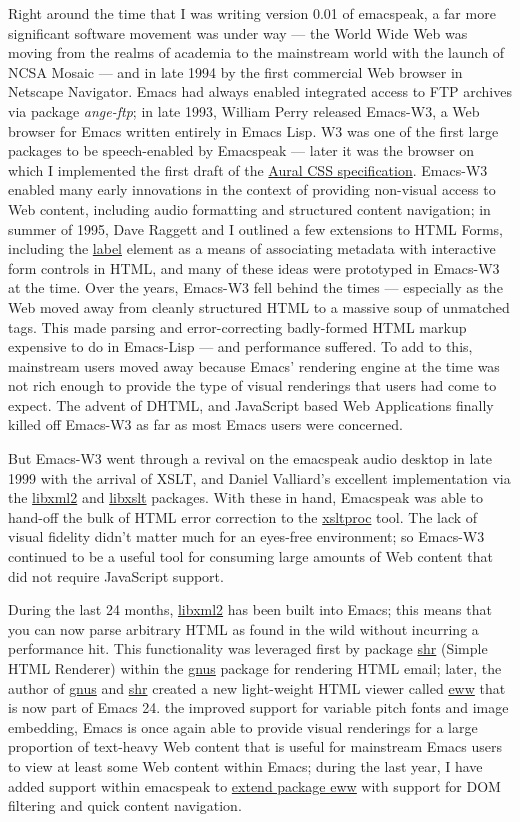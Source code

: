 \documentclass[11pt]{article}
\begin{document}
Right around the time that I was writing version 0.01 of
emacspeak, a far more significant software movement was under way
  —   the World Wide Web was moving from the realms of academia to
the mainstream world with the launch of NCSA Mosaic   — 
  and in
late 1994 by the first commercial Web browser in Netscape
Navigator. Emacs had always enabled integrated access to FTP
archives via package \emph{ange-ftp}; in late 1993, William Perry
released Emacs-W3, a Web browser for Emacs written entirely in
Emacs Lisp. W3 was one of the first large packages to be
speech-enabled by Emacspeak   —   later it was the browser on which
I implemented the first draft of the \href{http://www.w3.org/TR/CSS2/aural.html}{Aural CSS
specification}. Emacs-W3 enabled many early innovations in the
context of providing non-visual access to Web content, including
audio formatting and structured content navigation; in summer of
1995, Dave Raggett and I outlined a few extensions to HTML Forms,
including the \uline{label} element as a means of associating metadata
with interactive form controls in HTML, and many of these ideas
were prototyped in Emacs-W3 at the time. Over the years, Emacs-W3 fell
behind the times   —   especially as the Web moved away from
cleanly structured HTML to a massive soup of unmatched tags. This
made parsing and error-correcting badly-formed HTML markup
expensive to do in Emacs-Lisp  —  
and performance suffered. To add
to this, mainstream users moved away because Emacs' rendering
engine at the time was not rich enough to provide the type of
visual renderings that users had come to expect. The advent of
DHTML, and JavaScript based Web Applications finally killed off
Emacs-W3 as far as most Emacs users were concerned.

But Emacs-W3 went through a revival on the emacspeak audio
desktop in late 1999 with the arrival of XSLT, and Daniel
Valliard's excellent implementation via the \uline{libxml2} and
\uline{libxslt} packages. With these in hand, Emacspeak was able to
hand-off the bulk of HTML error correction to the \uline{xsltproc}
tool. The lack of visual fidelity didn't matter much for an
eyes-free environment; so Emacs-W3 continued to be a useful tool
for consuming large amounts of Web content that did not require
JavaScript support.

During the last 24 months, \uline{libxml2} has been built into Emacs;
this means that you can now parse arbitrary HTML as found in the
wild without incurring  a performance hit. This functionality was
leveraged first by package \uline{shr} (Simple HTML Renderer) within
the \uline{gnus} package for rendering HTML email; later, the author of
\uline{gnus} and \uline{shr} created a new light-weight HTML viewer called
\uline{eww} that is now part of Emacs 24. the improved support for
variable pitch fonts and image embedding, Emacs is once again
able to provide visual renderings for a large proportion of
text-heavy Web content that is useful for mainstream Emacs users
to view at least some Web content within Emacs; during the last
year, I have added support within emacspeak to \href{http://emacspeak.blogspot.com/2014/05/emacspeak-eww-updates-for-complete.html}{extend package
\uline{eww}} with support for DOM filtering and quick content
navigation.
\end{document}
